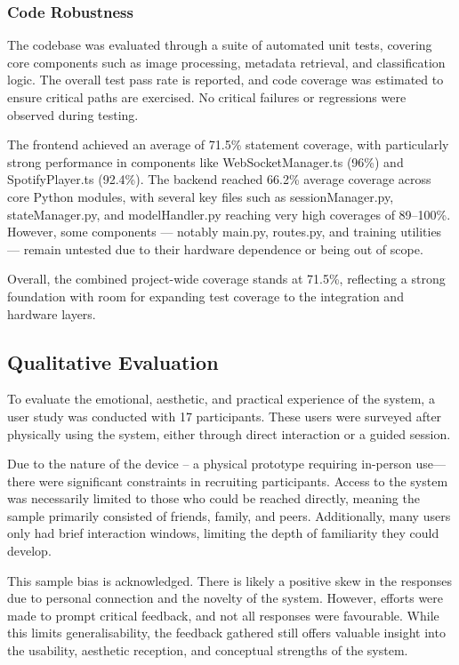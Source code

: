             \subsubsection{Code Robustness}
    
                The codebase was evaluated through a suite of automated unit tests, covering core components such as image processing, metadata retrieval, and classification logic. The overall test pass rate is reported, and code coverage was estimated to ensure critical paths are exercised. No critical failures or regressions were observed during testing.
    
                The frontend achieved an average of 71.5\% statement coverage, with particularly strong performance in components like WebSocketManager.ts (96\%) and SpotifyPlayer.ts (92.4\%). The backend reached 66.2\% average coverage across core Python modules, with several key files such as sessionManager.py, stateManager.py, and modelHandler.py reaching very high coverages of 89–100\%. However, some components — notably main.py, routes.py, and training utilities — remain untested due to their hardware dependence or being out of scope.
                
                Overall, the combined project-wide coverage stands at 71.5\%, reflecting a strong foundation with room for expanding test coverage to the integration and hardware layers.
    
        \subsection{Qualitative Evaluation}
    
            To evaluate the emotional, aesthetic, and practical experience of the system, a user study was conducted with 17 participants. These users were surveyed after physically using the system, either through direct interaction or a guided session.
    
            Due to the nature of the device -- a physical prototype requiring in-person use—there were significant constraints in recruiting participants. Access to the system was necessarily limited to those who could be reached directly, meaning the sample primarily consisted of friends, family, and peers. Additionally, many users only had brief interaction windows, limiting the depth of familiarity they could develop.
            
            This sample bias is acknowledged. There is likely a positive skew in the responses due to personal connection and the novelty of the system. However, efforts were made to prompt critical feedback, and not all responses were favourable. While this limits generalisability, the feedback gathered still offers valuable insight into the usability, aesthetic reception, and conceptual strengths of the system.
    
